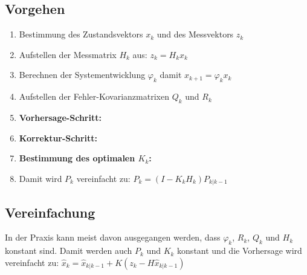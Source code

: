 	\subsection{Vorgehen}
	\begin{enumerate}
		\item Bestimmung des Zustandsvektors $x_k$ und des Messvektors $z_k$
		\item Aufstellen der Messmatrix $H_k$ aus: $z_k = H_k x_k$
		\item Berechnen der Systementwicklung $\varphi_k$ damit $x_{k+1}=\varphi_k x_k$
		\item Aufstellen der Fehler-Kovarianzmatrixen $Q_k$ und $R_k$
		\item \textbf{Vorhersage-Schritt:} \hspace{1cm}
		\item \textbf{Korrektur-Schritt:} \hspace{1cm}
		\item \textbf{Bestimmung des optimalen $K_k$:} \hspace{1cm}
		\item Damit wird $P_k$ vereinfacht zu: $P_k = (I-K_kH_k) P_{k|k-1}$
	\end{enumerate}
	
	\subsection{Vereinfachung}
		In der Praxis kann meist davon ausgegangen werden, dass $\varphi_k$, $R_k$,
		$Q_k$ und $H_k$ konstant sind. Damit werden auch $P_k$ und $K_k$ konstant und
		die Vorhersage wird vereinfacht zu: $\hat{x}_k = \hat{x}_{k|k-1} 
		+ K(z_k-H\hat{x}_{k|k-1})$ \\
